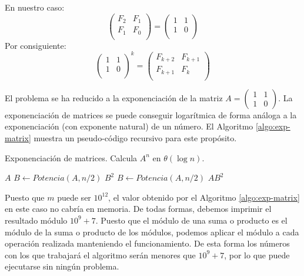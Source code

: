 \documentclass{article}
\theoremstyle{theorem-style}  %
\theoremstyle{definition}
\theoremstyle{example-style}
\begin{document}
    En nuestro caso:
    \begin{equation}
        \begin{pmatrix}
            F_{2} & F_{1} \\
            F_{1} & F_{0} \\
        \end{pmatrix}
        =
        \begin{pmatrix}
            1 & 1 \\
            1 & 0 \\
        \end{pmatrix}        
    \end{equation}
    Por consiguiente:
    \begin{equation}
        \begin{pmatrix}
            1 & 1 \\
            1 & 0 \\
        \end{pmatrix}^k
        =
        \begin{pmatrix}
            F_{k+2} & F_{k+1} \\
            F_{k+1} & F_{k} \\
        \end{pmatrix}        
    \end{equation}
    
    El problema se ha reducido a la exponenciación de la matriz $A =
    \begin{pmatrix} 
        1 & 1 \\ 
        1 & 0 
    \end{pmatrix}$.
    La exponenciación de matrices se puede conseguir logarítmica de forma análoga a la exponenciación (con exponente natural) de un número. El Algoritmo \ref{algo:exp-matrix} muestra un pseudo-código recursivo para este propósito.
    
    \begin{algorithm}
        \caption{Exponenciación de matrices. Calcula $A^n$ en $\theta(\log n)$.}
        \label{algo:exp-matrix}
        \begin{algorithmic}
                    \Return $A$
                    \State $B \gets Potencia(A,n/2)$
                    \State \Return $B^2$
                \Else
                    \State $B \gets Potencia(A,n/2)$
                    \State \Return $A B^2$                    
                \EndIf
            \EndFunction
        \end{algorithmic}
    \end{algorithm}

    Puesto que $m$ puede ser $10^{12}$, el valor obtenido por el Algoritmo \ref{algo:exp-matrix} en este caso no cabría en memoria. De todas formas, debemos imprimir el resultado módulo $10^9+7$. Puesto que el módulo de una suma o producto es el módulo de la suma o producto de los módulos, podemos aplicar el módulo a cada operación realizada manteniendo el funcionamiento. De esta forma los números con los que trabajará el algoritmo serán menores que $10^9+7$, por lo que puede ejecutarse sin ningún problema.
\end{document}
